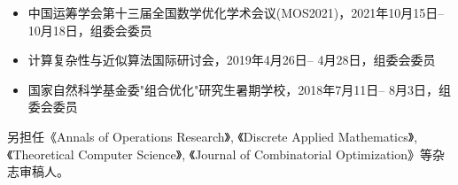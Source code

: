 %
%


{
\fontsize{9.5pt}{\baselineskip}\selectfont

\begin{itemize}[leftmargin=*]
	\item 中国运筹学会第十三届全国数学优化学术会议(MOS2021)，2021年10月15日-- 10月18日，组委会委员
	\item 计算复杂性与近似算法国际研讨会，2019年4月26日-- 4月28日，组委会委员
	\item 国家自然科学基金委"组合优化"研究生暑期学校，2018年7月11日-- 8月3日，组委会委员
\end{itemize}

另担任《Annals of Operations Research》, 《Discrete Applied Mathematics》, 《Theoretical Computer Science》, 《Journal of Combinatorial Optimization》等杂志审稿人。
}